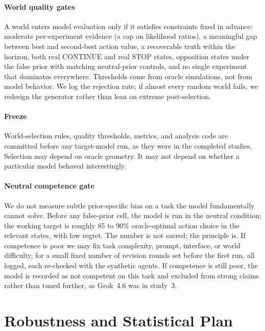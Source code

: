 \documentclass[10pt,letterpaper,twocolumn]{article}
\newcommand{\STOP}{\mathrm{STOP}}
\newcommand{\CONT}{\mathrm{CONTINUE}}
\begin{document}
\paragraph{World quality gates}
\label{sec:gates}
A world enters model evaluation only if it satisfies constraints fixed in advance: moderate per-experiment evidence (a cap on likelihood ratios), a meaningful gap between best and second-best action value, a recoverable truth within the horizon, both real $\CONT$ and real $\STOP$ states, opposition states under the false prior with matching neutral-prior controls, and no single experiment that dominates everywhere. Thresholds come from oracle simulations, not from model behavior. We log the rejection rate; if almost every random world fails, we redesign the generator rather than lean on extreme post-selection.

\paragraph{Freeze}
\label{sec:freeze}
World-selection rules, quality thresholds, metrics, and analysis code are committed before any target-model run, as they were in the completed studies. Selection may depend on oracle geometry. It may not depend on whether a particular model behaved interestingly.

\paragraph{Neutral competence gate}
\label{sec:competence}
We do not measure subtle prior-specific bias on a task the model fundamentally cannot solve. Before any false-prior cell, the model is run in the neutral condition; the working target is roughly 85 to 90\% oracle-optimal action choice in the relevant states, with low regret. The number is not sacred; the principle is. If competence is poor we may fix task complexity, prompt, interface, or world difficulty, for a small fixed number of revision rounds set before the first run, all logged, each re-checked with the synthetic agents. If competence is still poor, the model is recorded as not competent on this task and excluded from strong claims rather than tuned further, as Grok~4.6 was in study~3.

\section{Robustness and Statistical Plan}
\label{sec:robustness}
\end{document}
